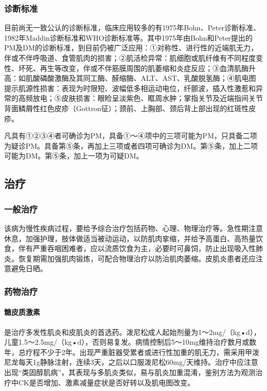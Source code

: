 \subsubsection{诊断标准}

目前尚无一致公认的诊断标准，临床应用较多的有1975年Bohn、Peter诊断标准、1982年Maddin诊断标准和WHO诊断标准等。其中1975年由Bohn和Peter提出的PM及DM的诊断标准，到目前仍被广泛应用：①对称性、进行性的近端肌无力，伴或不伴呼吸道、食管肌肉的损害；②肌活检异常：肌细胞或肌纤维有不同程度变性、坏死、再生等改变，伴或不伴筋膜周围的肌萎缩和炎症反应；③血清肌酶升高：如肌酸磷酸激酶及其同工酶、醛缩酶、ALT、AST、乳酸脱氢酶；④肌电图提示肌源性损害：表现为时限短、波幅低多相运动电位，纤颤波，插入性激惹和异常的高频放电；⑤皮肤损害：眼睑呈淡紫色、眶周水肿；掌指关节及近端指间关节背面鳞屑性红色皮疹（Gottron征）；颈前、上胸部、颈后背上部出现的红斑性皮疹。

凡具有①②③④者可确诊为PM，具备①～④项中的三项可能为PM，只具备二项为疑诊PM。具备第⑤条，再加上三项或者四项可确诊为DM。第⑤条，加上二项可能为DM。第⑤条，加上一项为可疑DM。

\subsection{治疗}

\subsubsection{一般治疗}

该病为慢性疾病过程，要给予综合治疗包括药物、心理、物理治疗等。急性期注意休息，加强护理，肢体做适当被动运动，以防肌肉挛缩，并给予高蛋白、高热量饮食，伴有严重吞咽困难者，应以流质饮食为主，必要时可鼻饲，防止出现吸入性肺炎。恢复期需加强肌肉锻炼，可配合物理治疗以防治肌肉萎缩。皮肌炎患者还应注意避免日晒。

\subsubsection{药物治疗}

\paragraph{糖皮质激素}

是治疗多发性肌炎和皮肌炎的首选药。泼尼松成人起始剂量为1～2mg/（kg•d），儿童1.5～2.5mg/（kg•d），否则易复发。病情控制后5～10mg维持治疗数月或数年，总疗程不少于2年。出现严重脏器受累者或进行性加重的肌无力，需采用甲泼尼龙每天1g静脉注射，连续3天，之后以口服泼尼松60mg/天维持。治疗中应注意出现“类固醇肌病”，其表现与多肌炎类似，易与肌炎加重混淆，鉴别方法为观测治疗中CK是否增加、激素减量症状是否好转以及肌电图改变。

